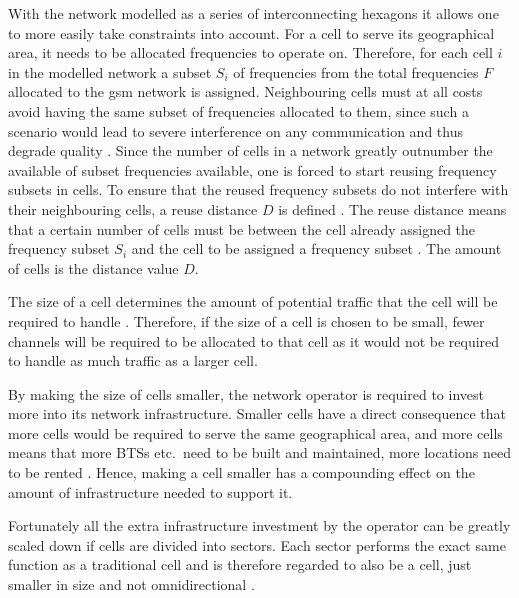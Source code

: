 With the network modelled as a series of interconnecting hexagons it allows one to more easily take constraints into account. For a cell to serve its geographical area, it needs to be allocated frequencies to operate on. Therefore, for each cell $i$ in the modelled network a subset $S_i$ of frequencies from the total frequencies $F$ allocated to the \gls{gsm} network is assigned\cite{GSMArchitectureProtocolsServices}. Neighbouring cells must at all costs avoid having the same subset of frequencies allocated to them, since such a scenario would lead to severe interference on any communication and thus degrade quality \cite{GSMArchitectureProtocolsServices}.
Since the number of cells in a network greatly outnumber the available of subset frequencies available, one is forced to start reusing frequency subsets in cells. To ensure that the reused frequency subsets do not interfere with their neighbouring cells, a reuse distance $D$ is defined \cite{GSMArchitectureProtocolsServices}. The reuse distance means that a certain number of cells must be between the cell already assigned the frequency subset $S_i$ and the cell to be assigned a frequency subset \cite{GSMArchitectureProtocolsServices}. The amount of cells is the distance value $D$.

The size of a cell determines the amount of potential traffic that the cell will be required to handle \cite{GSM92,Eisenblatter,GSMArchitectureProtocolsServices}. Therefore, if the size of a cell is chosen to be small, fewer channels will be required to be allocated to that cell as it would not be required to handle as much traffic as a larger cell. 

By making the size of cells smaller, the network operator is required to invest more into its network infrastructure. Smaller cells have a direct consequence that more cells would be required to serve the same geographical area, and more cells means that more \glspl{BTS} etc.\ need to be built and maintained, more locations need to be rented \cite{GSMArchitectureProtocolsServices}. Hence, making a cell smaller has a compounding effect on the amount of infrastructure needed to support it.

Fortunately all the extra infrastructure investment by the operator can be greatly scaled down if cells are divided into sectors\label{def:cellsector}. Each sector performs the exact same function as a traditional cell and is therefore regarded to also be a cell, just smaller in size and not omnidirectional \cite{GSMArchitectureProtocolsServices,GSM92,GSMSysEngin}. 

